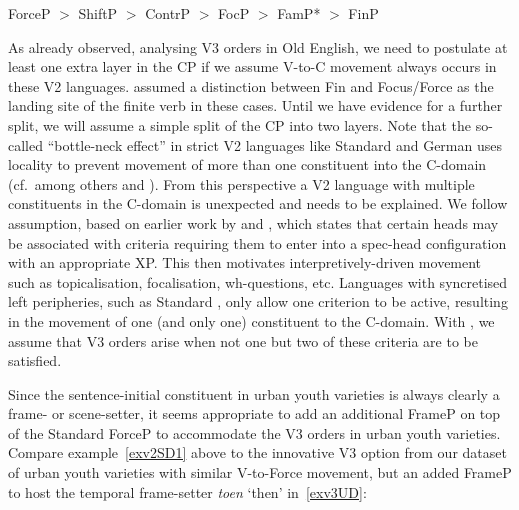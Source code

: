 \documentclass[output=paper]{langsci/langscibook}
\begin{document}
\ea ForceP $>$ ShiftP $>$ ContrP $>$ FocP $>$ FamP* $>$ FinP
\z

\noindent As \citet{Roberts:1996} already observed, analysing V3 orders in Old English, we need to postulate at least one extra layer in
the CP if we assume V-to-C movement always occurs in these V2
languages. \textcite{Roberts1996} assumed a distinction between Fin and
Focus/Force as the landing site of the finite verb in these cases. Until we
have evidence for a further split, we will assume a simple split of the CP into
two layers. Note that the so-called \enquote{bottle-neck effect} in strict
V2 languages like Standard  and German uses
locality to prevent movement of more than one constituent into the C-domain
(cf.\ among others \citealt{Roberts:2004} and \citealt{Mohr:2009}). From this
perspective a V2 language with multiple constituents in the
C-domain is unexpected and needs to be explained. We follow
 assumption, based on earlier work by
\textcite{Rizzi1997} and \citet{Haegeman:1995}, which states that certain heads
may be associated with criteria requiring them to enter into a spec-head
configuration with an appropriate XP\@. This then motivates
interpretively-driven movement such as topicalisation,
focalisation, wh-questions, etc. Languages with syncretised
left peripheries, such as Standard , only allow one criterion to be
active, resulting in the movement of one (and only one) constituent to the
C-domain.  With \textcite{Walkden:2017}, we assume that V3
orders arise when not one but two of these criteria are to be satisfied.

Since the sentence-initial constituent in  urban youth varieties is
always clearly a frame- or scene-setter, it seems appropriate to add an
additional FrameP on top of the Standard  ForceP to accommodate the
V3 orders in urban youth varieties. Compare
example~\eqref{exv2SD1} above to the innovative V3 option
from our dataset of  urban youth varieties with similar V-to-Force movement, but an added FrameP to host the temporal
frame-setter \emph{toen} `then' in~\eqref{exv3UD}:\largerpage[3]
\end{document}
